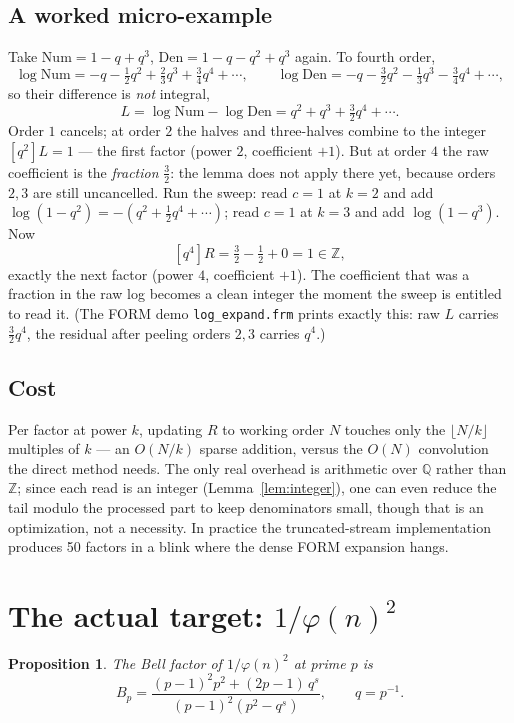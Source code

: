 \documentclass[11pt]{article}
\newtheorem{proposition}[theorem]{Proposition}
\begin{document}
\subsection{A worked micro-example}

Take $\mathrm{Num}=1-q+q^3$, $\mathrm{Den}=1-q-q^2+q^3$ again. To fourth order,
\[
\log\mathrm{Num}=-q-\tfrac12 q^2+\tfrac23 q^3+\tfrac34 q^4+\cdots,\qquad
\log\mathrm{Den}=-q-\tfrac32 q^2-\tfrac13 q^3-\tfrac34 q^4+\cdots,
\]
so their difference is \emph{not} integral,
\[
L=\log\mathrm{Num}-\log\mathrm{Den}
 =q^2+q^3+\tfrac32 q^4+\cdots .
\]
Order $1$ cancels; at order $2$ the halves and three-halves combine to the integer
$[q^2]L=1$ --- the first factor (power $2$, coefficient $+1$). But at order $4$ the
raw coefficient is the \emph{fraction} $\tfrac32$: the lemma does not apply there
yet, because orders $2,3$ are still uncancelled. Run the sweep: read $c=1$ at $k=2$
and add $\log(1-q^2)=-(q^2+\tfrac12 q^4+\cdots)$; read $c=1$ at $k=3$ and add
$\log(1-q^3)$. Now
\[
[q^4]R=\tfrac32-\tfrac12+0=1\in\mathbb{Z},
\]
exactly the next factor (power $4$, coefficient $+1$). The coefficient that was a
fraction in the raw log becomes a clean integer the moment the sweep is entitled to
read it. (The FORM demo \texttt{log\_expand.frm} prints exactly this: raw $L$ carries
$\tfrac32 q^4$, the residual after peeling orders $2,3$ carries $q^4$.)

\subsection{Cost}

Per factor at power $k$, updating $R$ to working order $N$ touches only the
$\lfloor N/k\rfloor$ multiples of $k$ --- an $O(N/k)$ sparse addition, versus the
$O(N)$ convolution the direct method needs. The only real overhead is arithmetic
over $\mathbb{Q}$ rather than $\mathbb{Z}$; since each read is an integer
(Lemma~\ref{lem:integer}), one can even reduce the tail modulo the processed part to
keep denominators small, though that is an optimization, not a necessity. In
practice the truncated-stream implementation produces 50 factors in a blink where
the dense FORM expansion hangs.

\section{The actual target: $1/\varphi(n)^2$}
\label{sec:target}

\begin{proposition}
\label{prop:bell-1overphi2}
The Bell factor of $1/\varphi(n)^2$ at prime $p$ is
\[
B_p = \frac{(p-1)^2p^2 + (2p-1)\,q^{s}}{(p-1)^2(p^2-q^{s})}, \qquad q = p^{-1}.
\]
\end{proposition}
\end{document}
